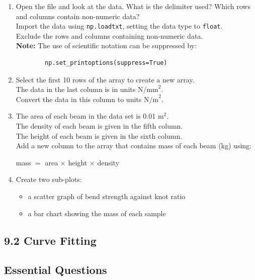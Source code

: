 \documentclass[11pt]{report}
\begin{document}
\begin{enumerate}[label=(\Alph*)]
    
    \item  Open the file and look at the data. What is the delimiter used? Which rows and columns contain non-numeric data? \\
    Import the data using {\tt np.loadtxt}, setting the data type to {\tt float}. \\
    Exclude the rows and columns containing non-numeric data.\\
    {\bf Note:} The use of scientific notation can be suppressed by:
    \begin{verbatim}
        np.set_printoptions(suppress=True)
    \end{verbatim}
    
    \item Select the first 10 rows of the array to create a new array.\\
    The data in the last column is in units $\mathrm{N/mm}^2$.\\
    Convert the data in this column to units $\mathrm{N/m}^2$.\\

    \item The area of each beam in the data set is 0.01 $\mathrm{m^2}$.\\
    The density of each beam is given in the fifth column. \\
    The height of each beam is given in the sixth column. \\
    Add a new column to the array that contains mass of each beam (kg) using:

    mass $=$ area $\times$ height $\times$ density
    
    \item Create two sub-plots:
    \begin{itemize}
        \item a scatter graph of  bend strength against knot ratio 
        \item a bar chart showing the mass of each sample
    \end{itemize}

\end{enumerate}

\subsection*{\Large 9.2 Curve Fitting}

\subsection*{Essential Questions}
\end{document}
